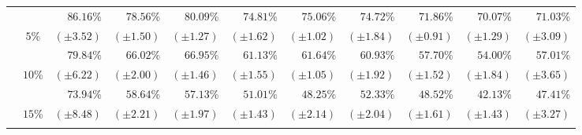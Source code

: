 \begin{table}[!htb]
\begin{center}
{\begin{tabular}{|c|c||r|r|r|r|r|r|r|r|r|}
						\cellcolor{colorTableHeader!15}
							& \cellcolor{colorTableHeader!15}
							& $86.16$\%
							& $78.56$\%
							& $80.09$\%
							& $74.81$\%
							& $75.06$\%
							& $74.72$\%
							& $71.86$\%
							& $70.07$\%
							& $71.03$\%
							\tabularnewline
						\cellcolor{colorTableHeader!15}
							& \multirow{-2}{*}{
								\cellcolor{colorTableHeader!15}
								$5$\%
							}
							& \footnotesize $(\pm3.52)$
							& \footnotesize $(\pm1.50)$
							& \footnotesize $(\pm1.27)$
							& \footnotesize $(\pm1.62)$
							& \footnotesize $(\pm1.02)$
							& \footnotesize $(\pm1.84)$
							& \footnotesize $(\pm0.91)$
							& \footnotesize $(\pm1.29)$
							& \footnotesize $(\pm3.09)$
							\tabularnewline
							\hhline{~----------}
						
						\cellcolor{colorTableHeader!15}
							& \cellcolor{colorTableHeader!15}
							& $79.84$\%
							& $66.02$\%
							& $66.95$\%
							& $61.13$\%
							& $61.64$\%
							& $60.93$\%
							& $57.70$\%
							& $54.00$\%
							& $57.01$\%
							\tabularnewline
						\cellcolor{colorTableHeader!15}
							& \multirow{-2}{*}{
								\cellcolor{colorTableHeader!15}
								$10$\%
							}
							& \footnotesize $(\pm6.22)$
							& \footnotesize $(\pm2.00)$
							& \footnotesize $(\pm1.46)$
							& \footnotesize $(\pm1.55)$
							& \footnotesize $(\pm1.05)$
							& \footnotesize $(\pm1.92)$
							& \footnotesize $(\pm1.52)$
							& \footnotesize $(\pm1.84)$
							& \footnotesize $(\pm3.65)$
							\tabularnewline
							\hhline{~----------}
						
						\cellcolor{colorTableHeader!15}
							& \cellcolor{colorTableHeader!15}
							& $73.94$\%
							& $58.64$\%
							& $57.13$\%
							& $51.01$\%
							& $48.25$\%
							& $52.33$\%
							& $48.52$\%
							& $42.13$\%
							& $47.41$\%
							\tabularnewline
						\cellcolor{colorTableHeader!15}
							& \multirow{-2}{*}{
								\cellcolor{colorTableHeader!15}
								$15$\%
							}
							& \footnotesize $(\pm8.48)$
							& \footnotesize $(\pm2.21)$
							& \footnotesize $(\pm1.97)$
							& \footnotesize $(\pm1.43)$
							& \footnotesize $(\pm2.14)$
							& \footnotesize $(\pm2.04)$
							& \footnotesize $(\pm1.61)$
							& \footnotesize $(\pm1.43)$
							& \footnotesize $(\pm3.27)$
							\tabularnewline
							\hhline{~----------}
						

\end{tabular}}
\end{center}
\end{table}
